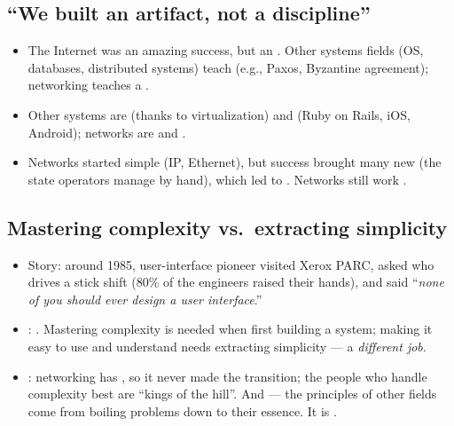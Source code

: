 \subsection{``We built an artifact, not a discipline''}
\begin{itemize}
\item The Internet was an amazing success, but an . Other systems fields (OS, databases, distributed systems) teach  (e.g., Paxos, Byzantine agreement); networking teaches a .
\item Other systems are  (thanks to virtualization) and  (Ruby on Rails, iOS, Android); networks are  and .
\item {} Networks started simple (IP, Ethernet), but success brought many new  (the state operators manage by hand), which led to . Networks still work .
\end{itemize}

\subsection{Mastering complexity vs.\ extracting simplicity}
\begin{itemize}
\item Story: around 1985, user-interface pioneer  visited Xerox PARC, asked who drives a stick shift (80\% of the engineers raised their hands), and said ``\emph{none of you should ever design a user interface}.''
\item {}: . Mastering complexity is needed when first building a system; making it easy to use and understand needs extracting simplicity --- a \emph{different job}.
\item {}: networking has , so it never made the transition; the people who handle complexity best are ``kings of the hill''. And  --- the principles of other fields come from boiling problems down to their essence. It is .
\end{itemize}

